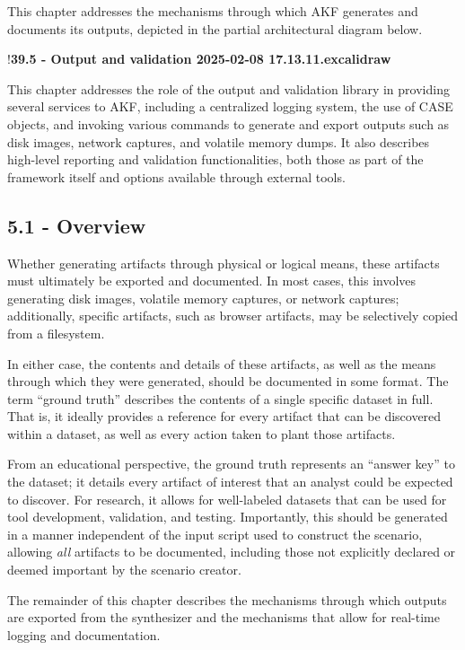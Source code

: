 This chapter addresses the mechanisms through which AKF generates and
documents its outputs, depicted in the partial architectural diagram
below.

!\textbf{39.5 - Output and validation 2025-02-08 17.13.11.excalidraw}

This chapter addresses the role of the output and validation library in
providing several services to AKF, including a centralized logging
system, the use of CASE objects, and invoking various commands to
generate and export outputs such as disk images, network captures, and
volatile memory dumps. It also describes high-level reporting and
validation functionalities, both those as part of the framework itself
and options available through external tools.

\subsection{5.1 - Overview}\label{overview}

Whether generating artifacts through physical or logical means, these
artifacts must ultimately be exported and documented. In most cases,
this involves generating disk images, volatile memory captures, or
network captures; additionally, specific artifacts, such as browser
artifacts, may be selectively copied from a filesystem.

In either case, the contents and details of these artifacts, as well as
the means through which they were generated, should be documented in
some format. The term ``ground truth'' describes the contents of a
single specific dataset in full. That is, it ideally provides a
reference for every artifact that can be discovered within a dataset, as
well as every action taken to plant those artifacts.

From an educational perspective, the ground truth represents an ``answer
key'' to the dataset; it details every artifact of interest that an
analyst could be expected to discover. For research, it allows for
well-labeled datasets that can be used for tool development, validation,
and testing. Importantly, this should be generated in a manner
independent of the input script used to construct the scenario, allowing
\emph{all} artifacts to be documented, including those not explicitly
declared or deemed important by the scenario creator.

The remainder of this chapter describes the mechanisms through which
outputs are exported from the synthesizer and the mechanisms that allow
for real-time logging and documentation.

